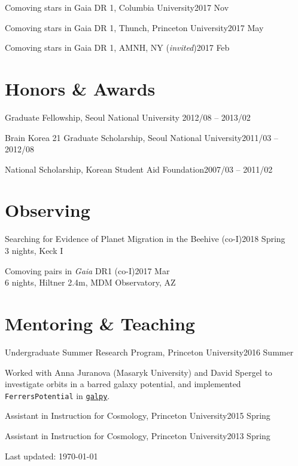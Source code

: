 \documentclass[11pt,letterpaper]{article}
\renewenvironment{itemize}{
  \begin{list}{}{
    \setlength{\leftmargin}{1.5em}
  }
}{
  \end{list}
}
\begin{document}
\begin{itemize}
  \setlength{\itemsep}{0em}

  \item Comoving stars in Gaia DR 1, Columbia University\hfill 2017 Nov
  \item Comoving stars in Gaia DR 1, Thunch, Princeton University\hfill 2017 May
  \item Comoving stars in Gaia DR 1, AMNH, NY ({\it invited})\hfill 2017 Feb
\end{itemize}

\section*{Honors \& Awards}

\begin{itemize}
  \setlength{\itemsep}{0em}

  \item Graduate Fellowship, Seoul National University \hfill 2012/08 -- 2013/02
  \item Brain Korea 21 Graduate Scholarship, Seoul National University\hfill 2011/03 -- 2012/08
	\item National Scholarship, Korean Student Aid Foundation\hfill 2007/03 -- 2011/02
\end{itemize}

\section*{Observing}
\begin{itemize}
  \item Searching for Evidence of Planet Migration in the Beehive (co-I)\hfill 2018 Spring\\
    3 nights, Keck I
  \item Comoving pairs in {\it Gaia} DR1 (co-I)\hfill 2017 Mar\\
    6 nights, Hiltner 2.4m, MDM Observatory, AZ
\end{itemize}

\section*{Mentoring \& Teaching}

\begin{itemize}
  \setlength\itemsep{0em}
  \item Undergraduate Summer Research Program, Princeton University\hfill 2016 Summer
    \begin{adjustwidth}{15pt}{}
      Worked with Anna Juranova (Masaryk University) and David Spergel to
      investigate orbits in a barred galaxy potential, and implemented {\tt
      FerrersPotential} in \href{http://galpy.readthedocs.io/en/latest/}{\tt galpy}.
    \end{adjustwidth}
  \item Assistant in Instruction for Cosmology, Princeton University\hfill 2015 Spring
  \item Assistant in Instruction for Cosmology, Princeton University\hfill 2013 Spring
\end{itemize}

\bigskip

\begin{center}
  \begin{footnotesize}
    Last updated: \today \\
  \end{footnotesize}
\end{center}
\end{document}
